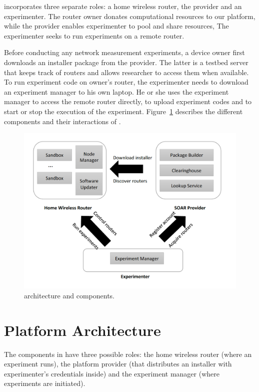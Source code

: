 \sysname incorporates three separate roles: a home wireless router, the \sysname provider and an experimenter. The router owner donates computational resources to our platform, while the \sysname provider enables experimenter to pool and share resources, The experimenter seeks to run experiments on a remote router.

Before conducting any network measurement experiments, a device owner first downloads an installer package from the \sysname provider. The latter is a testbed server that keeps track of routers and allows researcher to access them when available. To run experiment code on owner's router, the experimenter needs to download an experiment manager to his own laptop. He or she uses the experiment manager to access the remote router directly, to upload experiment codes and to start or stop the execution of the experiment. Figure~\ref{fig-arch} describes the different components and their interactions of \sysname.

\begin{figure}%
\centering
\includegraphics[width=0.8\columnwidth]{figure/soar-arch.png}
\caption{\sysname architecture and components.}
\label{fig-arch}
\end{figure}

\section{Platform Architecture}
The components in \sysname have three possible roles: the home wireless router (where an experiment runs), the platform provider (that distributes an installer with experimenter's credentials inside) and the experiment manager (where experiments are initiated).

